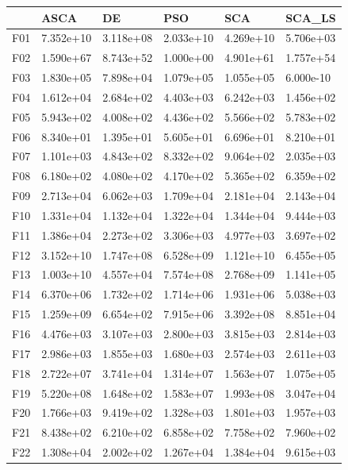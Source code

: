 \begin{tabular}{llllll}
\toprule
{} &       ASCA &         DE &        PSO &        SCA &     SCA\_LS \\
\midrule
F01  &  7.352e+10 &  3.118e+08 &  2.033e+10 &  4.269e+10 &  5.706e+03 \\
F02  &  1.590e+67 &  8.743e+52 &  1.000e+00 &  4.901e+61 &  1.757e+54 \\
F03  &  1.830e+05 &  7.898e+04 &  1.079e+05 &  1.055e+05 &  6.000e-10 \\
F04  &  1.612e+04 &  2.684e+02 &  4.403e+03 &  6.242e+03 &  1.456e+02 \\
F05  &  5.943e+02 &  4.008e+02 &  4.436e+02 &  5.566e+02 &  5.783e+02 \\
F06  &  8.340e+01 &  1.395e+01 &  5.605e+01 &  6.696e+01 &  8.210e+01 \\
F07  &  1.101e+03 &  4.843e+02 &  8.332e+02 &  9.064e+02 &  2.035e+03 \\
F08  &  6.180e+02 &  4.080e+02 &  4.170e+02 &  5.365e+02 &  6.359e+02 \\
F09  &  2.713e+04 &  6.062e+03 &  1.709e+04 &  2.181e+04 &  2.143e+04 \\
F10  &  1.331e+04 &  1.132e+04 &  1.322e+04 &  1.344e+04 &  9.444e+03 \\
F11  &  1.386e+04 &  2.273e+02 &  3.306e+03 &  4.977e+03 &  3.697e+02 \\
F12  &  3.152e+10 &  1.747e+08 &  6.528e+09 &  1.121e+10 &  6.455e+05 \\
F13  &  1.003e+10 &  4.557e+04 &  7.574e+08 &  2.768e+09 &  1.141e+05 \\
F14  &  6.370e+06 &  1.732e+02 &  1.714e+06 &  1.931e+06 &  5.038e+03 \\
F15  &  1.259e+09 &  6.654e+02 &  7.915e+06 &  3.392e+08 &  8.851e+04 \\
F16  &  4.476e+03 &  3.107e+03 &  2.800e+03 &  3.815e+03 &  2.814e+03 \\
F17  &  2.986e+03 &  1.855e+03 &  1.680e+03 &  2.574e+03 &  2.611e+03 \\
F18  &  2.722e+07 &  3.741e+04 &  1.314e+07 &  1.563e+07 &  1.075e+05 \\
F19  &  5.220e+08 &  1.648e+02 &  1.583e+07 &  1.993e+08 &  3.047e+04 \\
F20  &  1.766e+03 &  9.419e+02 &  1.328e+03 &  1.801e+03 &  1.957e+03 \\
F21  &  8.438e+02 &  6.210e+02 &  6.858e+02 &  7.758e+02 &  7.960e+02 \\
F22  &  1.308e+04 &  2.002e+02 &  1.267e+04 &  1.384e+04 &  9.615e+03 \\

\end{tabular}
